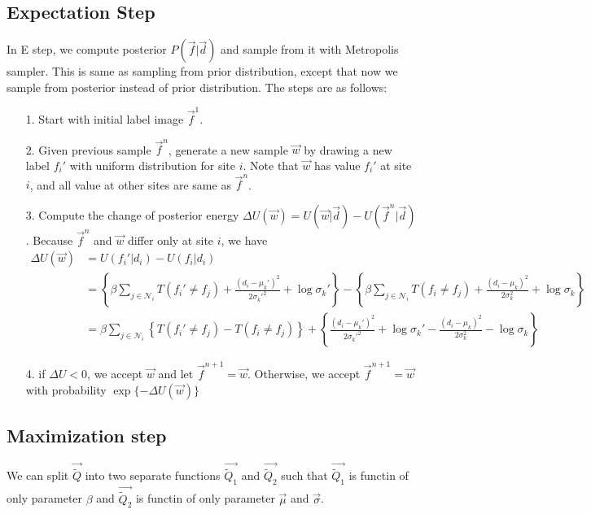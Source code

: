 \documentclass[12pt]{article}
\begin{document}
\subsection{Expectation Step}
In E step, we compute posterior $P(\vec f | \vec d)$ and sample from it with Metropolis sampler. This is same as sampling from prior distribution, except that now we sample from posterior instead of prior distribution. The steps are as follows:
\begin{itemize}
  \item[1.] Start with initial label image $\vec f^1$.
  \item[2.] Given previous sample $\vec f^{n}$, generate a new sample $\vec w$ by drawing a new label  $f_i'$  with uniform distribution for site $i$. Note that $\vec w$ has value $f_i'$ at site $i$, and all value at other sites are same as $\vec f^{n}$. 
   \item[3.] Compute the change of posterior energy $\Delta U(\vec w) = U(\vec w | \vec d) - U(\vec f^n | \vec d)$. Because $\vec f^{n}$ and $\vec w$ differ only at site $i$, we have
     \begin{align*}
       \Delta U(\vec w) &= U(f_i'| d_i) - U(f_i | d_i) \\
       &= \left \{\beta \sum_{j\in \mathcal{N}_i} T(f_i' \neq f_j) + \frac{(d_i - \mu_k')^2}{2\sigma_k'^2} + \log \sigma_k' \right \}
- \left \{\beta \sum_{j\in \mathcal{N}_i} T(f_i \neq f_j) + \frac{(d_i - \mu_k)^2}{2\sigma_k^2} + \log \sigma_k \right \} \\
       &= \beta \sum_{j \in \mathcal{N}_i} \left \{  T(f_i' \neq f_j) - T(f_i \neq f_j) \right \} + \left \{ \frac{(d_i - \mu_k')^2}{2\sigma_k'^2} + \log \sigma_k' - \frac{(d_i - \mu_k)^2}{2\sigma_k^2} - \log \sigma_k  \right \}
     \end{align*}
     \item[4.] if $\Delta U < 0$, we accept $\vec w$ and let $\vec f^{n+1} = \vec w$. Otherwise, we accept $\vec f^{n+1} = \vec w$ with probability $\exp \{ - \Delta U(\vec w)\}$
\end{itemize}


\subsection{Maximization step}
We can split $\vec {\widetilde Q}$ into two separate functions $\vec {\widetilde Q_1}$ and $\vec {\widetilde Q_2}$ such that $\vec {\widetilde Q_1 }$ is functin of only parameter $\beta$ and $\vec {\widetilde Q_2}$ is functin of only parameter $\vec \mu$ and $\vec \sigma$. 
\end{document}
